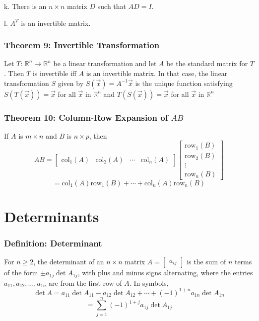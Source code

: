 \documentclass{article}
\begin{document}
k. There is an $n \times n$ matrix $D$ such that $AD = I$. 

l. $A^T$ is an invertible matrix. 

\subsubsection*{Theorem 9: Invertible Transformation}
Let $T$: $\mathbb{R}^n \xrightarrow{} \mathbb{R}^n$ be a linear transformation and let $A$ be the standard matrix for $T$. Then $T$ is invertible iff $A$ is an invertible matrix. In that case, the linear transformation $S$ given by $S( \vec x) = A^{-1} \vec x$ is the unique function satisfying $S(T(\vec x)) = \vec x$ for all $\vec x \text{ in }\mathbb{R}^n$ and $T(S(\vec x)) = \vec x$ for all $\vec x$ in $\mathbb{R}^n$

\subsubsection*{Theorem 10: Column-Row Expansion of $AB$}
If $A$ is $m \times n$ and $B$ is $n \times p$, then 
$$AB = \begin{bmatrix}
    \text{col}_1 (A) & \text{col}_2(A) & \cdots & \text{col}_n (A)
\end{bmatrix}
\begin{bmatrix}
    \text{row}_1 (B) \\
    \text{row}_2 (B) \\
    \vdots \\
    \text{row}_n (B)
\end{bmatrix}$$
$$= \text{col}_1(A)\text{row}_1 (B) + \cdots + \text{col}_n (A) \text{row}_n (B)$$

\section{Determinants}
\subsubsection*{Definition: Determinant}
For $n\geq 2$, the determinant of an $n \times n$ matrix $A = \begin{bmatrix}
    a_{ij}
\end{bmatrix}$ is the sum of $n$ terms of the form $\pm a_{1j} \det A_{1j}$, with plus and minus signs alternating, where the entries $a_{11}, a_{12}, \dots , a_{1n}$ are from the first row of $A$. In symbols, 
$$\det A = a_{11} \det A_{11} - a_{12} \det A_{12} + \cdots + (-1)^{1+n} a_{1n} \det A_{1n}$$
$$= \sum_{j=1}^{n} (-1)^{1+j} a_{1j} \det A_{1j}$$
\end{document}
